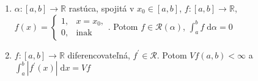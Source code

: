 \documentclass[12pt]{article}
\newcommand{\ud}{\;\mathrm{d}}
\newcommand{\cinterval}[1]{\ensuremath{\left[#1\right]}}
\begin{document}
\begin{enumerate}
    \item $\alpha:\cinterval{a,b}\rightarrow\mathbb{R}$ rastúca, spojitá v
        $x_0 \in \cinterval{a,b}$, $f: \cinterval{a,b}\rightarrow\mathbb{R}$,\newline
        $f(x)=\begin{cases}1,&x=x_0,\\0,&\textrm{inak}\end{cases}$.
        Potom $f \in \mathcal{R}(\alpha)$, $\int_a^b f\ud\alpha=0$

    \item $f:\cinterval{a,b}\rightarrow\mathbb{R}$ diferencovateľná, $f^{\prime}\in\mathcal{R}$.
        Potom $Vf \left(a,b\right) < \infty$ a $\int_a^b |f^{\prime}(x)|\ud x=Vf$

\end{enumerate}
\end{document}
